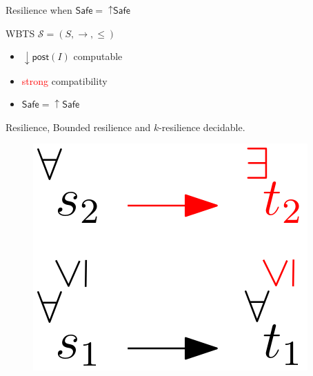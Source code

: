 \documentclass{beamer}
\newcommand{\post}{\textsf{post}}
\newcommand{\Safe}{\textsf{Safe}}
\begin{document}
  \begin{frame}{Resilience when $\Safe = {\uparrow \Safe}$}
   




\begin{theorem}
WBTS $\mathscr{S}=(S,\rightarrow, \leq)$ 
\begin{itemize}
\item $\mathop{\downarrow} \post(I)$ computable %
\item \textcolor{red}{strong} compatibility
\item $\Safe = \mathop{\uparrow} \Safe$
\end{itemize}
{\sc Resilience}, {\sc Bounded resilience} 
and {\sc $k$-resilience} decidable.
\end{theorem}


\begin{center}
 	\begin{figure}
\includegraphics[width=.25\textwidth]{WSTS_strong}
	\end{figure}
\end{center}  

       \end{frame}
\end{document}
